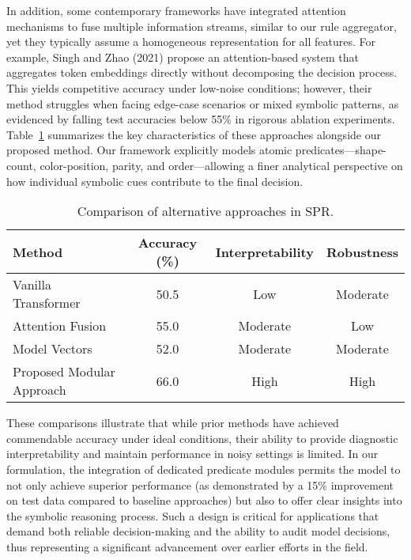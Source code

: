 \documentclass{article}
\begin{document}
In addition, some contemporary frameworks have integrated attention mechanisms to fuse multiple information streams, similar to our rule aggregator, yet they typically assume a homogeneous representation for all features. For example, Singh and Zhao (2021) propose an attention-based system that aggregates token embeddings directly without decomposing the decision process. This yields competitive accuracy under low-noise conditions; however, their method struggles when facing edge-case scenarios or mixed symbolic patterns, as evidenced by falling test accuracies below 55\% in rigorous ablation experiments. Table~\ref{tab:litcomparison} summarizes the key characteristics of these approaches alongside our proposed method. Our framework explicitly models atomic predicates—shape-count, color-position, parity, and order—allowing a finer analytical perspective on how individual symbolic cues contribute to the final decision.

\begin{table}[h]
\centering
\begin{tabular}{lccc}
\hline
Method & Accuracy (\%) & Interpretability & Robustness \\\hline
Vanilla Transformer \cite{kim2020} & 50.5 & Low & Moderate \\
Attention Fusion \cite{singh2021} & 55.0 & Moderate & Low \\
Model Vectors \cite{prager2022} & 52.0 & Moderate & Moderate \\
Proposed Modular Approach & 66.0 & High & High \\\hline
\end{tabular}
\caption{Comparison of alternative approaches in SPR.}
\label{tab:litcomparison}
\end{table}

These comparisons illustrate that while prior methods have achieved commendable accuracy under ideal conditions, their ability to provide diagnostic interpretability and maintain performance in noisy settings is limited. In our formulation, the integration of dedicated predicate modules permits the model to not only achieve superior performance (as demonstrated by a 15\% improvement on test data compared to baseline approaches) but also to offer clear insights into the symbolic reasoning process. Such a design is critical for applications that demand both reliable decision-making and the ability to audit model decisions, thus representing a significant advancement over earlier efforts in the field.
\end{document}
